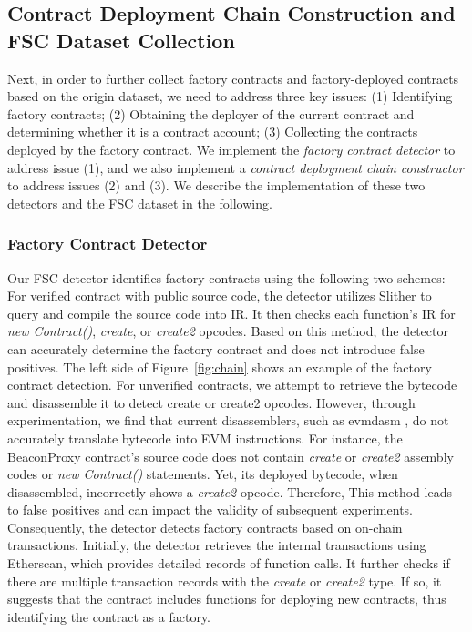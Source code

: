 \documentclass[acmsmall,screen]{acmart}
\begin{document}
	\subsection{Contract Deployment Chain Construction and FSC Dataset Collection} Next, in order to further collect factory contracts and factory-deployed contracts based on the origin dataset, we need to address three key issues: (1) Identifying factory contracts; (2) Obtaining the deployer of the current contract and determining whether it is a contract account; (3) Collecting the contracts deployed by the factory contract. We implement the \textit{factory contract detector} to address issue (1), and we also implement a \textit{contract deployment chain constructor} to address issues (2) and (3). We describe the implementation of these two detectors and the FSC dataset in the following.

	

	\subsubsection{Factory Contract Detector}
	Our FSC detector identifies factory contracts using the following two schemes: For verified contract with public source code, the detector utilizes Slither \cite{slither-tool} to query and compile the source code into IR. It then checks each function’s IR for \textit{new Contract()}, \textit{create}, or \textit{create2} opcodes. Based on this method, the detector can accurately determine the factory contract and does not introduce false positives. The left side of Figure~\ref{fig:chain} shows an example of the factory contract detection. For unverified contracts, we attempt to retrieve the bytecode and disassemble it to detect create or create2 opcodes. However, through experimentation, we find that current disassemblers, such as evmdasm \cite{evmdasm}, do not accurately translate bytecode into EVM instructions. For instance, the BeaconProxy \cite{BeaconProxy} contract’s source code does not contain \textit{create} or \textit{create2} assembly codes or \textit{new Contract()} statements. Yet, its deployed bytecode, when disassembled, incorrectly shows a \textit{create2} opcode. Therefore, This method leads to false positives and can impact the validity of subsequent experiments. Consequently, the detector detects factory contracts based on on-chain transactions. Initially, the detector retrieves the internal transactions using Etherscan, which provides detailed records of function calls. It further checks if there are multiple transaction records with the \textit{create} or \textit{create2} type. If so, it suggests that the contract includes functions for deploying new contracts, thus identifying the contract as a factory.
\end{document}

